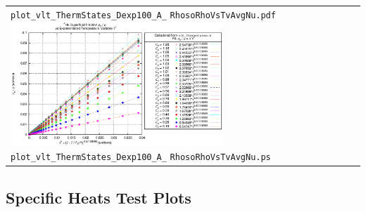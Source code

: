 \documentclass[11pt]{article}
\begin{document}
\begin{center}
\begin{tabular}[\textwidth]{p{8cm}p{8cm}}
  \verb|plot_vlt_ThermStates_Dexp100_A_|\newline
  \verb|RhosoRhoVsTvAvgNu.pdf|
\else
  \includegraphics[width=8cm]{plot_vlt_ThermStates_Dexp100_A_RhosoRhoVsTvAvgNu.ps}\newline
  \verb|plot_vlt_ThermStates_Dexp100_A_|\newline
  \verb|RhosoRhoVsTvAvgNu.ps|
\fi
 \\
\end{tabular}
\end{center}


\subsection{Specific Heats Test Plots}
\end{document}
